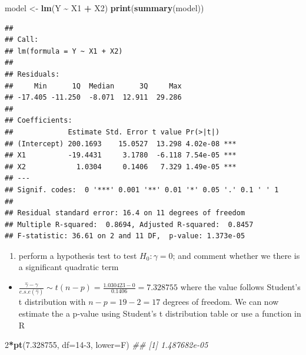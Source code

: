 \documentclass[
]{book}
\newenvironment{Shaded}{\begin{snugshade}}{\end{snugshade}}
\newcommand{\CommentTok}[1]{\textcolor[rgb]{0.56,0.35,0.01}{\textit{#1}}}
\newcommand{\DataTypeTok}[1]{\textcolor[rgb]{0.13,0.29,0.53}{#1}}
\newcommand{\DecValTok}[1]{\textcolor[rgb]{0.00,0.00,0.81}{#1}}
\newcommand{\FloatTok}[1]{\textcolor[rgb]{0.00,0.00,0.81}{#1}}
\newcommand{\KeywordTok}[1]{\textcolor[rgb]{0.13,0.29,0.53}{\textbf{#1}}}
\newcommand{\NormalTok}[1]{#1}
\newcommand{\OperatorTok}[1]{\textcolor[rgb]{0.81,0.36,0.00}{\textbf{#1}}}
\newcommand{\StringTok}[1]{\textcolor[rgb]{0.31,0.60,0.02}{#1}}
\providecommand{\tightlist}{%
  \setlength{\itemsep}{0pt}\setlength{\parskip}{0pt}}
\theoremstyle{definition}
\theoremstyle{definition}
\theoremstyle{definition}
\theoremstyle{remark}
\begin{document}
\begin{Shaded}
\begin{Highlighting}[]
\NormalTok{model \textless{}{-}}\StringTok{ }\KeywordTok{lm}\NormalTok{(Y }\OperatorTok{\textasciitilde{}}\StringTok{ }\NormalTok{X1 }\OperatorTok{+}\StringTok{ }\NormalTok{X2)}
\KeywordTok{print}\NormalTok{(}\KeywordTok{summary}\NormalTok{(model))}
\end{Highlighting}
\end{Shaded}

\begin{verbatim}
## 
## Call:
## lm(formula = Y ~ X1 + X2)
## 
## Residuals:
##     Min      1Q  Median      3Q     Max 
## -17.405 -11.250  -8.071  12.911  29.286 
## 
## Coefficients:
##             Estimate Std. Error t value Pr(>|t|)    
## (Intercept) 200.1693    15.0527  13.298 4.02e-08 ***
## X1          -19.4431     3.1780  -6.118 7.54e-05 ***
## X2            1.0304     0.1406   7.329 1.49e-05 ***
## ---
## Signif. codes:  0 '***' 0.001 '**' 0.01 '*' 0.05 '.' 0.1 ' ' 1
## 
## Residual standard error: 16.4 on 11 degrees of freedom
## Multiple R-squared:  0.8694,	Adjusted R-squared:  0.8457 
## F-statistic: 36.61 on 2 and 11 DF,  p-value: 1.373e-05
\end{verbatim}

\begin{enumerate}
\def\labelenumi{\alph{enumi})}
\setcounter{enumi}{3}
\tightlist
\item
  perform a hypothesis test to test \(H_0:\gamma=0\); and comment whether we there is a significant quadratic term
\end{enumerate}

\begin{itemize}
\tightlist
\item
  \(\frac{\hat{\gamma} - \gamma}{e.s.e(\hat{\gamma})} \sim t(n-p) = \frac{1.030423 - 0}{0.1406} = 7.328755\) where the value follows Student's t distribution with \(n-p = 19 - 2 = 17\) degrees of freedom. We can now estimate the a p-value using Student's t distribution table or use a function in R
\end{itemize}

\begin{Shaded}
\begin{Highlighting}[]
\DecValTok{2}\OperatorTok{*}\KeywordTok{pt}\NormalTok{(}\FloatTok{7.328755}\NormalTok{, }\DataTypeTok{df=}\DecValTok{14{-}3}\NormalTok{, }\DataTypeTok{lower=}\NormalTok{F)}
\CommentTok{\#\# [1] 1.487682e{-}05}
\end{Highlighting}
\end{Shaded}
\end{document}
